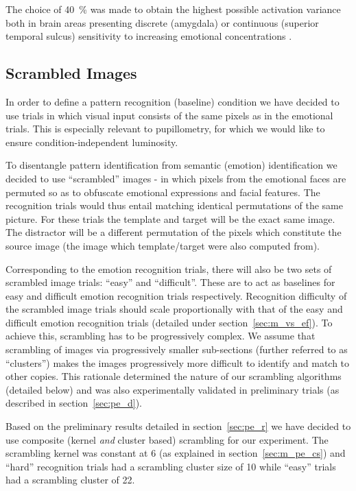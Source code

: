 	    The choice of \SI{40}{\percent} was made to obtain the highest possible activation variance both in brain areas presenting discrete (amygdala) or continuous (superior temporal sulcus) sensitivity to increasing emotional concentrations \citep{Harris2012}.
	\subsection{Scrambled Images}\label{sec:m_vs_si}
	    In order to define a pattern recognition (baseline) condition we have decided to use trials in which visual input consists of the same pixels as in the emotional trials.
	    This is especially relevant to pupillometry, for which we would like to ensure condition-independent luminosity.
	    
	    To disentangle pattern identification from semantic (emotion) identification we decided to use “scrambled” images - in which pixels from the emotional faces are permuted so as to obfuscate emotional expressions and facial features.
	    The recognition trials would thus entail matching identical permutations of the same picture.
	    For these trials the template and target will be the exact same image.
	    The distractor will be a different permutation of the pixels which constitute the source image (the image which template/target were also computed from). 
	    
	    Corresponding to the emotion recognition trials, there will also be two sets of scrambled image trials: “easy” and “difficult”.
	    These are to act as baselines for easy and difficult emotion recognition trials respectively.
	    Recognition difficulty of the scrambled image trials should scale proportionally with that of the easy and difficult emotion recognition trials (detailed under section~\ref{sec:m_vs_ef}).
	    To achieve this, scrambling has to be progressively complex.
	    We assume that scrambling of images via progressively smaller sub-sections (further referred to as “clusters”) makes the images progressively more difficult to identify and match to other copies.
	    This rationale determined the nature of our scrambling algorithms (detailed below) and was also experimentally validated in preliminary trials (as described in section~\ref{sec:pe_d}).
	    
	    Based on the preliminary results detailed in section~\ref{sec:pe_r} we have decided to use composite (kernel \textit{and} cluster based) scrambling for our experiment.
	    The scrambling kernel was constant at \SI{6}{\pixel} (as explained in section~\ref{sec:m_pe_cs}) 
	    and “hard” recognition trials had a scrambling cluster size of \SI{10}{\pixel} while “easy” trials had a scrambling cluster of \SI{22}{\pixel}.
	    

